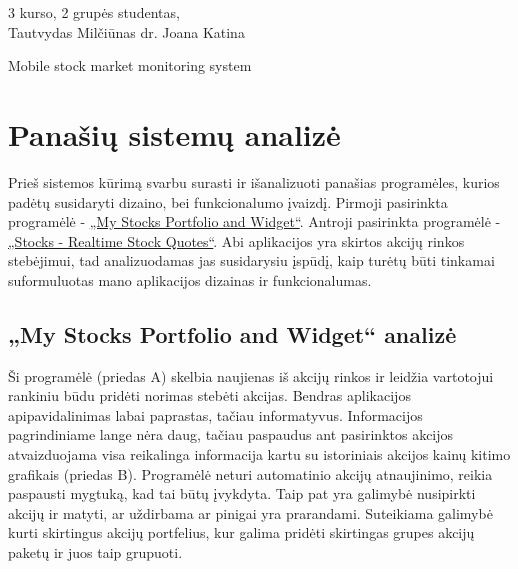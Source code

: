 \documentclass[a4paper,12pt,fleqn]{article}
\begin{document}
{3 kurso, 2 grupės studentas, \\ Tautvydas Milčiūnas} 
 {}{}{}{}%
 {dr. Joana Katina}

\tableofcontents

\bothabstracts{}%
{Mobile stock market monitoring system} %
{}%





\newpage
\section{Panašių sistemų analizė}
Prieš sistemos kūrimą svarbu surasti ir išanalizuoti panašias programėles, kurios padėtų susidaryti dizaino, bei funkcionalumo įvaizdį. Pirmoji pasirinkta programėlė -
\href{https://play.google.com/store/apps/details?id=co.peeksoft.stocks}{„My Stocks Portfolio and Widget“}.  Antroji pasirinkta programėlė - \href{https://play.google.com/store/apps/details?id=org.dayup.stocks}{„Stocks - Realtime Stock Quotes“}. Abi aplikacijos yra skirtos akcijų rinkos stebėjimui, tad analizuodamas jas susidarysiu įspūdį, kaip turėtų būti tinkamai suformuluotas mano aplikacijos dizainas ir funkcionalumas.
\subsection{„My Stocks Portfolio and Widget“ analizė}
Ši programėlė (priedas A) skelbia naujienas iš akcijų rinkos ir leidžia vartotojui rankiniu būdu pridėti norimas stebėti akcijas. Bendras aplikacijos apipavidalinimas labai paprastas, tačiau informatyvus. Informacijos pagrindiniame lange nėra daug, tačiau paspaudus ant pasirinktos akcijos atvaizduojama visa reikalinga informacija kartu su istoriniais akcijos kainų kitimo grafikais (priedas B). Programėlė neturi automatinio akcijų atnaujinimo, reikia paspausti mygtuką, kad tai būtų įvykdyta. Taip pat yra galimybė nusipirkti akcijų ir matyti, ar uždirbama ar pinigai yra prarandami. Suteikiama galimybė kurti skirtingus akcijų portfelius, kur galima pridėti skirtingas grupes akcijų paketų ir juos taip grupuoti.
\end{document}
